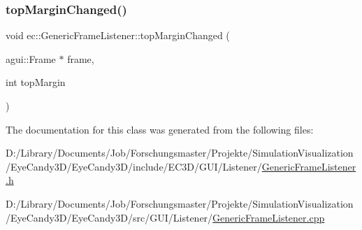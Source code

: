 \subsubsection{\texorpdfstring{top\+Margin\+Changed()}{topMarginChanged()}}
{\footnotesize\ttfamily void ec\+::\+Generic\+Frame\+Listener\+::top\+Margin\+Changed (\begin{DoxyParamCaption}\item[{agui\+::\+Frame $\ast$}]{frame,  }\item[{int}]{top\+Margin }\end{DoxyParamCaption})\hspace{0.3cm}{\ttfamily [override]}}



The documentation for this class was generated from the following files\+:\begin{DoxyCompactItemize}
\item 
D\+:/\+Library/\+Documents/\+Job/\+Forschungsmaster/\+Projekte/\+Simulation\+Visualization/\+Eye\+Candy3\+D/\+Eye\+Candy3\+D/include/\+E\+C3\+D/\+G\+U\+I/\+Listener/\mbox{\hyperlink{_generic_frame_listener_8h}{Generic\+Frame\+Listener.\+h}}\item 
D\+:/\+Library/\+Documents/\+Job/\+Forschungsmaster/\+Projekte/\+Simulation\+Visualization/\+Eye\+Candy3\+D/\+Eye\+Candy3\+D/src/\+G\+U\+I/\+Listener/\mbox{\hyperlink{_generic_frame_listener_8cpp}{Generic\+Frame\+Listener.\+cpp}}\end{DoxyCompactItemize}
